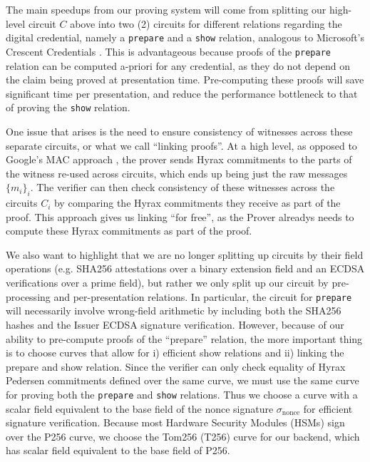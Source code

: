 The main speedups from our proving system will come from splitting our high-level circuit $C$ above into two (2) circuits for different relations regarding the digital credential, 
namely a \texttt{prepare} and a \texttt{show} relation, analogous to Microsoft's Crescent Credentials \cite{cryptoeprint:2024/2013}. 
This is advantageous because proofs of the \texttt{prepare} relation can be computed a-priori for any credential, as they do not depend on the claim being proved at presentation time. 
Pre-computing these proofs will save significant time per presentation, and reduce the performance bottleneck to that of proving the \texttt{show} relation.

One issue that arises is the need to ensure consistency of witnesses across these separate circuits, or what we call ``linking proofs''. 
At a high level, as opposed to Google's MAC approach \cite{cryptoeprint:2024/2010}, the prover sends Hyrax commitments to the parts of the witness re-used across circuits, 
which ends up being just the raw messages $\{m_i\}_i$. 
The verifier can then check consistency of these witnesses across the circuits $C_i$ by comparing the Hyrax commitments they receive as part of the proof. 
This approach gives us linking ``for free'', as the Prover alreadys needs to compute these Hyrax commitments as part of the proof.

We also want to highlight that we are no longer splitting up circuits by their field operations 
(e.g. SHA256 attestations over a binary extension field and an ECDSA verifications over a prime field), but rather we only split up our circuit by pre-processing and per-presentation relations. 
In particular, the circuit for \texttt{prepare} will necessarily involve wrong-field arithmetic by including both the SHA256 hashes and the Issuer ECDSA signature verification. 
However, because of our ability to pre-compute proofs of the ``prepare'' relation, the more important thing is to choose curves that allow for i) efficient show relations and ii) linking the prepare and show relation. 
Since the verifier can only check equality of Hyrax Pedersen commitments defined over the same curve, we must use the same curve for proving both the \texttt{prepare} and \texttt{show} relations.
Thus we choose a curve with a scalar field equivalent to the base field of the nonce signature $\sigma_{\text{nonce}}$ for efficient signature verification. 
Because most Hardware Security Modules (HSMs) sign over the P256 curve, we choose the Tom256 (T256) curve for our backend, which has scalar field equivalent to the base field of P256. 

